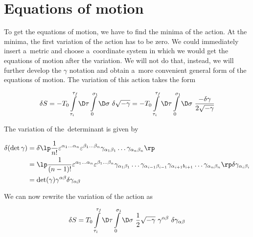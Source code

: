 
\section{Equations of motion}
\label{sec:general_EOM}

To get the equations of motion, we have to find the minima of the action. At the minima, the first variation of the action has to be zero. We could immediately insert a~metric and choose a~coordinate system in which we would get the equations of motion after the variation. 
We will not do that, instead, we will further develop the $\gamma$ notation and obtain a~more convenient general form of the equations of motion. The variation of this action takes the form

\begin{equation}
    \delta S = -T_0 \int\limits_{\tau_i}^{\tau_f} \D \tau \int\limits_{0}^{\sigma_1} \D \sigma ~ \delta \sqrt{- \gamma} = -T_0 \int\limits_{\tau_i}^{\tau_f} \D \tau \int\limits_{0}^{\sigma_1} \D \sigma ~ \frac{-\delta \gamma}{ 2 \sqrt{ - \gamma}}
\end{equation}

\noindent
The variation of the~determinant is given by

\begin{equation}
\begin{aligned}
    \delta (\det \gamma) & = 
    \delta \lp \frac{1}{n!} \varepsilon^{\alpha_1 \dots \alpha_n} \varepsilon^{\beta_1 \dots \beta_n} 
    \gamma_{\alpha_1 \beta_1} \dots \gamma_{\alpha_n \beta_n} \rp \\
    & = \lp \frac{1}{(n-1)!} \varepsilon^{\alpha_1 \dots \alpha_n} \varepsilon^{\beta_1 \dots \beta_n}
    \gamma_{\alpha_1 \beta_1} \dots \gamma_{\alpha_{i-1} \beta_{i-1}} \gamma_{\alpha_{i+1} b_{i+1}} \dots \gamma_{\alpha_n \beta_n} \rp \delta \gamma_{\alpha_i \beta_i} \\
    & = \det (\gamma) \gamma^{\alpha \beta} \delta \gamma_{\alpha \beta}
\end{aligned}
\end{equation}

\noindent
We can now rewrite the variation of the action as

\begin{equation}
\label{eq:var_action1}
    \delta S =  T_0 \int\limits_{\tau_i}^{\tau_f} \D \tau \int\limits_{0}^{\sigma_1} \D \sigma ~ \frac{1}{2} \sqrt{-\gamma}~ \gamma^{\alpha \beta} ~ \delta \gamma_{\alpha \beta}
\end{equation}

